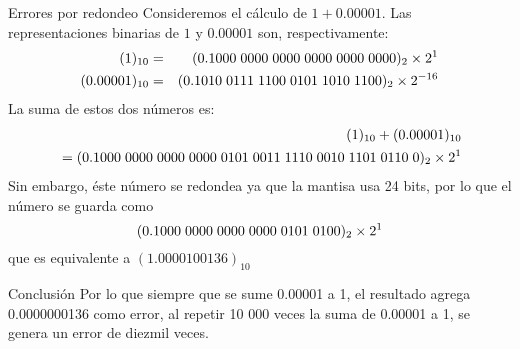 \documentclass[pdf, azure]{prosper}
\begin{document}
\begin{slide}{Errores por redondeo}
Consideremos el cálculo de $1+0.00001$. Las representaciones binarias de $1$ y $0.00001$ son, respectivamente:
\begin{eqnarray}
(1)_{10} &=& (0.1000 \hspace{0.1cm} 0000 \hspace{0.1cm} 0000 \hspace{0.1cm} 0000 \hspace{0.1cm} 0000 \hspace{0.1cm} 0000)_{2} \times 2^{1} \nonumber \\
(0.00001)_{10} &=& (0.1010 \hspace{0.1cm} 0111 \hspace{0.1cm}  1100 \hspace{0.1cm}  0101 \hspace{0.1cm} 1010 \hspace{0.1cm} 1100)_{2} \times 2^{-16} \nonumber
\end{eqnarray}
La suma de estos dos números es:
\begin{eqnarray}
(1)_{10}+(0.00001)_{10} \nonumber \\
{} = (0.1000 \hspace{0.1cm} 0000 \hspace{0.1cm} 0000 \hspace{0.1cm} 0000 \hspace{0.1cm} 0101 \hspace{0.1cm} 0011 \hspace{0.1cm} 1110 \hspace{0.1cm} 0010 \hspace{0.1cm} 1101 \hspace{0.1cm} 0110 \hspace{0.1cm} 0)_{2} \times 2^{1} \nonumber
\end{eqnarray}
Sin embargo, éste número se redondea ya que la mantisa usa 24 bits, por lo que el número se guarda como
\[ (0.1000 \hspace{0.1cm} 0000 \hspace{0.1cm} 0000 \hspace{0.1cm} 0000 \hspace{0.1cm} 0101 \hspace{0.1cm} 0100)_{2} \times 2^{1} \]
que es equivalente a $(1.0000 1001 36)_{10}$
\end{slide}
\begin{slide}{Conclusión}
Por lo que siempre que se sume 0.00001 a 1, el resultado agrega 0.0000000136 como error, al repetir 10 000 veces la suma de 0.00001 a 1, se genera un error de diezmil veces.
\end{slide}
\end{document}
